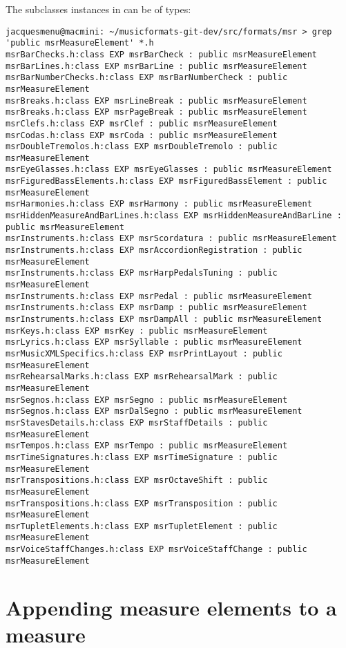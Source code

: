 The  subclasses instances in {\tt } can be of types:
\begin{lstlisting}[language=Terminal]
jacquesmenu@macmini: ~/musicformats-git-dev/src/formats/msr > grep 'public msrMeasureElement' *.h
msrBarChecks.h:class EXP msrBarCheck : public msrMeasureElement
msrBarLines.h:class EXP msrBarLine : public msrMeasureElement
msrBarNumberChecks.h:class EXP msrBarNumberCheck : public msrMeasureElement
msrBreaks.h:class EXP msrLineBreak : public msrMeasureElement
msrBreaks.h:class EXP msrPageBreak : public msrMeasureElement
msrClefs.h:class EXP msrClef : public msrMeasureElement
msrCodas.h:class EXP msrCoda : public msrMeasureElement
msrDoubleTremolos.h:class EXP msrDoubleTremolo : public msrMeasureElement
msrEyeGlasses.h:class EXP msrEyeGlasses : public msrMeasureElement
msrFiguredBassElements.h:class EXP msrFiguredBassElement : public msrMeasureElement
msrHarmonies.h:class EXP msrHarmony : public msrMeasureElement
msrHiddenMeasureAndBarLines.h:class EXP msrHiddenMeasureAndBarLine : public msrMeasureElement
msrInstruments.h:class EXP msrScordatura : public msrMeasureElement
msrInstruments.h:class EXP msrAccordionRegistration : public msrMeasureElement
msrInstruments.h:class EXP msrHarpPedalsTuning : public msrMeasureElement
msrInstruments.h:class EXP msrPedal : public msrMeasureElement
msrInstruments.h:class EXP msrDamp : public msrMeasureElement
msrInstruments.h:class EXP msrDampAll : public msrMeasureElement
msrKeys.h:class EXP msrKey : public msrMeasureElement
msrLyrics.h:class EXP msrSyllable : public msrMeasureElement
msrMusicXMLSpecifics.h:class EXP msrPrintLayout : public msrMeasureElement
msrRehearsalMarks.h:class EXP msrRehearsalMark : public msrMeasureElement
msrSegnos.h:class EXP msrSegno : public msrMeasureElement
msrSegnos.h:class EXP msrDalSegno : public msrMeasureElement
msrStavesDetails.h:class EXP msrStaffDetails : public msrMeasureElement
msrTempos.h:class EXP msrTempo : public msrMeasureElement
msrTimeSignatures.h:class EXP msrTimeSignature : public msrMeasureElement
msrTranspositions.h:class EXP msrOctaveShift : public msrMeasureElement
msrTranspositions.h:class EXP msrTransposition : public msrMeasureElement
msrTupletElements.h:class EXP msrTupletElement : public msrMeasureElement
msrVoiceStaffChanges.h:class EXP msrVoiceStaffChange : public msrMeasureElement
\end{lstlisting}


\section{Appending measure elements to a measure}

